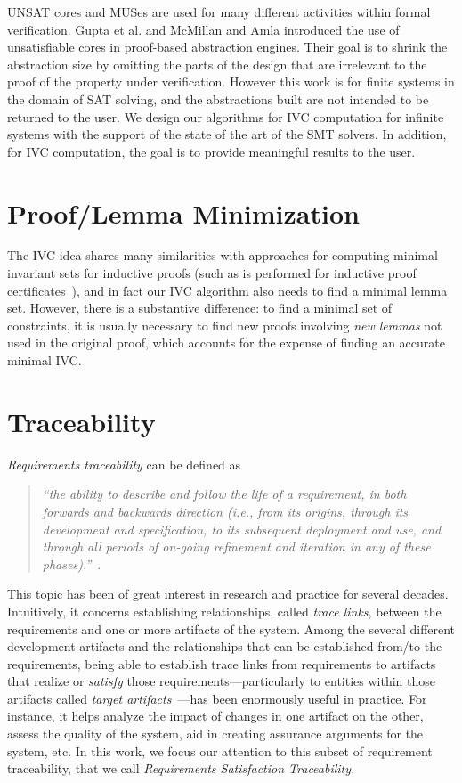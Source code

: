 UNSAT cores and MUSes are used for many different activities within
formal verification. Gupta et al. \cite{gupta2003iterative} and
McMillan and Amla \cite{mcmillan2003automatic} introduced the use of
unsatisfiable cores in proof-based abstraction engines. Their goal is
to shrink the abstraction size by omitting the parts of the design
that are irrelevant to the proof of the property under verification.
However this work is for finite systems in the domain of SAT solving,
 and the abstractions built are not intended to be returned to the user.
 We design our algorithms for IVC computation for
 infinite systems with the support of the state of the art of the SMT solvers. In addition, for IVC computation, the goal is to provide meaningful results to the user.

\section{Proof/Lemma Minimization}
The IVC idea shares many similarities with approaches for computing minimal invariant sets for inductive proofs (such as is performed for inductive proof certificates~\cite{piskac2016, Ivrii14:invariants}), and in fact our IVC algorithm also needs to find a minimal lemma set.  However, there is a substantive difference: to find a minimal set of constraints, it is usually necessary to find new proofs involving {\em new lemmas} not used in the original proof, which accounts for the expense of finding an accurate minimal IVC.


\section{Traceability}
\emph{Requirements traceability} can be defined as

\begin{quotation}
\textit{``the ability to describe and follow the life of a requirement, in both forwards and backwards direction (i.e., from its origins, through its development and specification, to its subsequent deployment and use, and through all periods of on-going refinement and iteration in any of these phases).''}~\cite{gotel}.
\end{quotation}

This topic has been of great interest in research and practice for several decades. Intuitively, it concerns establishing relationships, called \emph{trace links}, between the requirements and one or more artifacts of the system.
Among the several different development artifacts and the relationships that can be established from/to the requirements, being able to establish trace links from requirements to artifacts that realize or \emph{satisfy} those requirements---particularly
to entities within those artifacts called \emph{target artifacts}~\cite{gotel2012traceability}---has been enormously useful in practice. For instance, it helps analyze the impact of changes in one artifact on the other, assess the quality of the system, aid in creating assurance arguments for the system, etc. In this work, we focus our attention to this subset of requirement traceability, that we call \emph{Requirements Satisfaction Traceability.}

